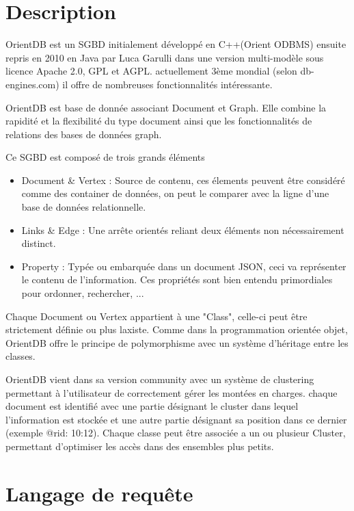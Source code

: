 \documentclass[a4paper,fleqn,12pt]{report}
\begin{document}
\section{Description}

OrientDB est un SGBD initialement développé en C++(Orient ODBMS) ensuite repris en 2010 en Java par Luca Garulli dans une version multi-modèle sous licence Apache 2.0, GPL et AGPL. actuellement 3ème mondial (selon db-engines.com) il offre de nombreuses fonctionnalités intéressante. 

OrientDB est base de donnée associant Document et Graph. Elle combine la rapidité et la flexibilité du type document ainsi que les fonctionnalités de relations des bases de données graph. 

Ce SGBD est composé de trois grands éléments 

\begin{itemize}
\item Document \& Vertex : Source de contenu, ces élements peuvent être considéré comme des container de données, on peut le comparer avec la ligne d'une base de données relationnelle.
\item Links \& Edge : Une arrête orientés reliant deux éléments non nécessairement distinct.
\item Property : Typée ou embarquée dans un document JSON, ceci va représenter le contenu de l'information. Ces propriétés sont bien entendu primordiales pour ordonner, rechercher, ...
\end{itemize}

Chaque Document ou Vertex appartient à une "Class", celle-ci peut être strictement définie ou plus laxiste. Comme dans la programmation orientée objet, OrientDB offre le principe de polymorphisme avec un système d'héritage entre les classes. 

OrientDB vient dans sa version community avec un système de clustering permettant à l'utilisateur de correctement gérer les montées en charges. chaque document est identifié avec une partie désignant le cluster dans lequel l'information est stockée et une autre partie désignant sa position dans ce dernier (exemple @rid: 10:12). Chaque classe peut être associée a un ou plusieur Cluster, permettant d'optimiser les accès dans des ensembles  plus petits.


\section{Langage de requête}
\end{document}
